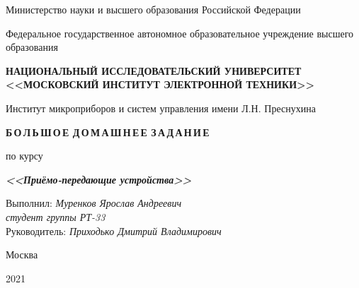 \thispagestyle{empty}
\setcounter{page}{0}

\begin{center}
    Министерство науки  и высшего образования Российской Федерации

    \vspace{1ex}

    Федеральное государственное автономное образовательное учреждение высшего образования

    \textbf{НАЦИОНАЛЬНЫЙ ИССЛЕДОВАТЕЛЬСКИЙ УНИВЕРСИТЕТ <<МОСКОВСКИЙ ИНСТИТУТ ЭЛЕКТРОННОЙ ТЕХНИКИ>>}

    \vspace{1ex}

    Институт микроприборов и систем управления имени Л.Н. Преснухина
\end{center}

\vspace{13ex}

\begin{center}
    \textbf{Б\,О\,Л\,Ь\,Ш\,О\,Е Д\,О\,М\,А\,Ш\,Н\,Е\,Е З\,А\,Д\,А\,Н\,И\,Е}
    \vspace{1ex}

    по курсу

    \textbf{\textit{<<Приёмо-передающие устройства>>}}

\end{center}

\vspace{20ex}

\begin{flushright}
    \noindent
    Выполнил: \textit{Муренков Ярослав Андреевич} \\
    \textit{студент группы РТ-33} \\
    Руководитель: \textit{Приходько Дмитрий Владимирович}
\end{flushright}

\vfill

\begin{center}
    Москва

    2021
\end{center}

\newpage
